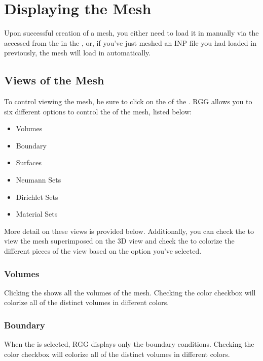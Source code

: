 \section{Displaying the Mesh}
\label{section:DisplayingMeshes}

Upon successful creation of a mesh, you either need to load it in manually via the  accessed from the  in the , or, if you've just meshed an INP file you had loaded in previously, the mesh will load in automatically.

\subsection{Views of the Mesh}
To control viewing the mesh, be sure to click on the  of the .  RGG allows you to six different options to control the  of the mesh, listed below:

\begin{itemize}
	\item{Volumes}
	\item{Boundary}
	\item{Surfaces}
	\item{Neumann Sets}
	\item{Dirichlet Sets}
	\item{Material Sets}
\end{itemize}

More detail on these views is provided below.  Additionally, you can check the  to view the mesh superimposed on the 3D view and check the  to colorize the different pieces of the view based on the option you've selected.

\subsubsection{Volumes}
Clicking the  shows all the volumes of the mesh.  Checking the color checkbox will colorize all of the distinct volumes in different colors.

\subsubsection{Boundary}
When the  is selected, RGG displays only the boundary conditions.  Checking the color checkbox will colorize all of the distinct volumes in different colors.

